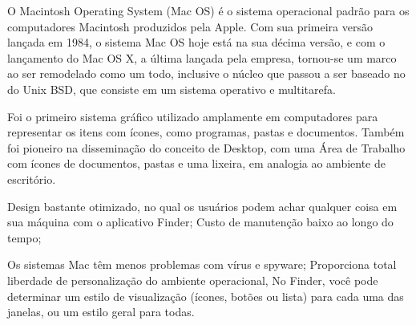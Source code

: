 O Macintosh Operating System (Mac OS) é o sistema operacional padrão para os computadores Macintosh produzidos pela Apple. Com sua primeira versão lançada em 1984, o sistema Mac OS hoje está na sua décima versão, e com o lançamento do Mac OS X, a última lançada pela empresa, tornou-se um marco ao ser remodelado como um todo, inclusive o núcleo que passou a ser baseado no do Unix BSD,  que consiste em um sistema operativo e multitarefa.

Foi o primeiro sistema gráfico utilizado amplamente em computadores para representar os itens com ícones, como programas, pastas e documentos. Também foi pioneiro na disseminação do conceito de Desktop, com uma Área de Trabalho com ícones de documentos, pastas e uma lixeira, em analogia ao ambiente de escritório.

Design bastante otimizado, no qual os usuários podem achar qualquer coisa em sua máquina com o aplicativo Finder;
Custo de manutenção baixo ao longo do tempo;

Os sistemas Mac têm menos problemas com vírus e spyware;
Proporciona total liberdade de personalização do ambiente operacional, No Finder, você pode determinar um estilo de visualização (ícones, botões ou lista) para cada uma das janelas, ou um estilo geral para todas.
